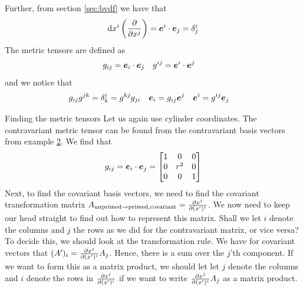 \documentclass[a4paper, 12pt]{article}
\begin{document}
Further, from section \ref{sec:bvdf} we have that
%
\begin{align*}
 \text{d} x^i \left(\frac{\partial {}}{\partial{x^j}}\right) = \boldsymbol{e}^i\cdot\boldsymbol{e}_j = \delta^i_j
\end{align*}
%
The metric tensors are defined as
%
\begin{align*}
 &g_{ij} = \boldsymbol{e}_i\cdot\boldsymbol{e}_j&
 &g^{ij} = \boldsymbol{e}^i\cdot\boldsymbol{e}^j
\end{align*}
%
and we notice that
%
\begin{align*}
 &g_{ij} g^{jk} = \delta_k^i = g^{kj} g_{ji}&
 &\boldsymbol{e}_i = g_{ij}\boldsymbol{e}^j &
 &\boldsymbol{e}^i = g^{ij}\boldsymbol{e}_j&
\end{align*}
%
\begin{example}{Finding the metric tensors}
 \label{ex:fmt}
 Let us again use cylinder coordinates.
 The contravariant metric tensor can be found from the contravariant
 basis vectors from example \hyperref[ex:vft]{2}. We find that
 \begin{align*}
  g_{ij} = \boldsymbol{e}_i\cdot\boldsymbol{e}_j =
  \begin{bmatrix}
   1 & 0 & 0\\
   0 & r^2 & 0\\
   0 & 0 & 1
  \end{bmatrix}
 \end{align*}
 Next, to find the covariant basis vectors, we need to find the covariant
 transformation matrix $A_{\text{unprimed}\to \text{primed}, \text{covariant}}
 = \frac{\partial {x^j}}{\partial{(x')^i}}$. We now need to keep our head straight to find out how
 to represent this matrix. Shall we let $i$ denote the columns and $j$ the
 rows as we did for the contravariant matrix, or vice versa? To decide this, we
 should look at the transformation rule. We have for covariant vectors that
 $(A')_i = \frac{\partial {x^j}}{\partial{(x')^i}} A_j$. Hence, there is a sum over the $j$'th
 component. If we want to form this as a matrix product, we should let let $j$
 denote the columns and $i$ denote the rows in $\frac{\partial {x^j}}{\partial{(x')^i}}$ if we want
 to write $\frac{\partial {x^j}}{\partial{(x')^i}} A_j$ as a matrix product.


\end{example}
\end{document}
